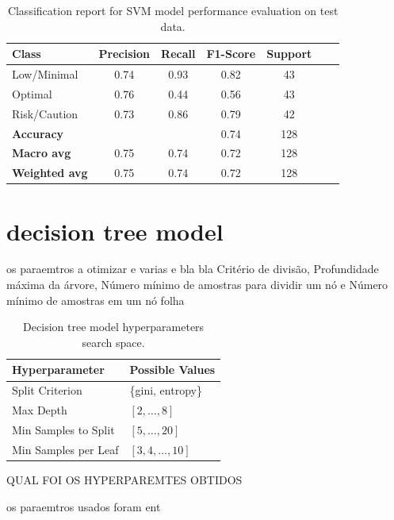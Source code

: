\documentclass[conference]{IEEEtran}
\begin{document}
\begin{table}[H]
\centering
\caption{Classification report for SVM model performance evaluation on test data.}
\begin{tabular}{lcccccc}
\toprule
\textbf{Class} & \textbf{Precision} & \textbf{Recall} & \textbf{F1-Score} & \textbf{Support} \\
\midrule
Low/Minimal & 0.74 & 0.93 & 0.82 & 43 \\
Optimal & 0.76 & 0.44 & 0.56 & 43 \\
Risk/Caution & 0.73 & 0.86 & 0.79 & 42 \\
\midrule
\textbf{Accuracy} &  &  & 0.74 & 128 \\
\textbf{Macro avg} & 0.75 & 0.74 & 0.72 & 128 \\
\textbf{Weighted avg} & 0.75 & 0.74 & 0.72 & 128 \\
\bottomrule
\end{tabular}
\end{table}


\section{decision tree model}

os paraemtros a otimizar e varias e bla bla Critério de divisão, Profundidade máxima da árvore, Número mínimo de amostras para dividir um nó e Número mínimo de amostras em um nó folha

\begin{table}[H]
\centering
\caption{Decision tree model hyperparameters search space.}
\label{parametrosDTree}
\begin{tabular}{ll}
\toprule
Hyperparameter & Possible Values \\
\midrule
Split Criterion & \{gini, entropy\} \\ 
Max Depth & $[2, \dots, 8]$ \\ 
Min Samples to Split & $[5, \dots, 20]$ \\ 
Min Samples per Leaf & $[3, 4, \dots, 10]$ \\
\bottomrule
\end{tabular}
\end{table}

QUAL FOI OS HYPERPAREMTES OBTIDOS


os paraemtros usados foram ent
\end{document}

